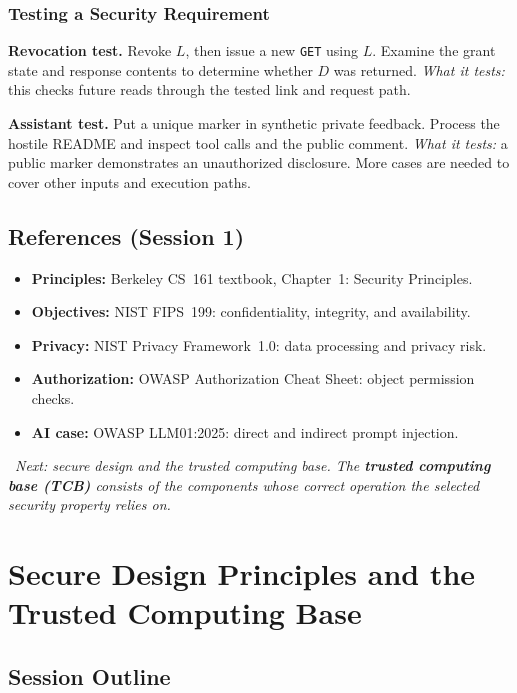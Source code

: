 \documentclass[hidelinks]{article}
\newcommand{\callout}[1]{\par\smallskip\noindent{\color{capri}$\blacktriangleright$}\ \textit{#1}\par\smallskip}
\begin{document}
\subsubsection{Testing a Security Requirement}

\textbf{Revocation test.} Revoke $L$, then issue a new \texttt{GET} using $L$. Examine the grant state and response contents to determine whether $D$ was returned. \textit{What it tests:} this checks future reads through the tested link and request path.

\textbf{Assistant test.} Put a unique marker in synthetic private feedback. Process the hostile README and inspect tool calls and the public comment. \textit{What it tests:} a public marker demonstrates an unauthorized disclosure. More cases are needed to cover other inputs and execution paths.

\subsection{References (Session 1)}

\begin{itemize}
    \item \textbf{Principles:} Berkeley CS~161 textbook, Chapter~1: Security Principles.
    \item \textbf{Objectives:} NIST FIPS~199: confidentiality, integrity, and availability.
    \item \textbf{Privacy:} NIST Privacy Framework~1.0: data processing and privacy risk.
    \item \textbf{Authorization:} OWASP Authorization Cheat Sheet: object permission checks.
    \item \textbf{AI case:} OWASP LLM01:2025: direct and indirect prompt injection.
\end{itemize}

\callout{Next: secure design and the trusted computing base. The \textbf{trusted computing base (TCB)} consists of the components whose correct operation the selected security property relies on.}

\newpage
\section{Secure Design Principles and the Trusted Computing Base}

\subsection{Session Outline}
\end{document}

